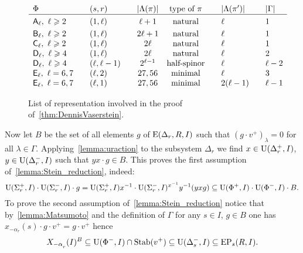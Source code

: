 \begin{figure}
\[\begin{array}{l @{\qquad} l @{\qquad} c @{\quad} c @{\qquad} l @{\qquad} l}
\Phi                                 & (s,r)         & |\Lambda(\pi)| & \text{type of $\pi$} & |\Lambda(\pi')|& |\Gamma|  \\ \hline\vphantom{\Bigl(}
\rA_\ell,\ \ell\geqslant 2           & (1,\ell)      & \ell+1         & \text{natural}       & \ell           & 1  \\     
\rB_\ell,\ \ell\geqslant 2           & (1,\ell)      & 2\ell+1        & \text{natural}       & \ell           & 1  \\     
\rC_\ell,\ \ell\geqslant 2           & (1,\ell)      & 2\ell          & \text{natural}       & \ell           & 1  \\
\rD_\ell,\ \ell\geqslant 4           & (1,\ell)      & 2\ell          & \text{natural}       & \ell           & 2  \\ 
\rD_\ell,\ \ell\geqslant 4           & (\ell,\ell-1) & 2^{\ell-1}     & \text{half-spinor}   & \ell           & \ell-2  \\
\rE_\ell,\ \ell=6,7                  & (\ell,2)      & 27, 56         & \text{minimal}       & \ell           & 3       \\ 
\rE_\ell,\ \ell=6,7                  & (\ell,1)      & 27, 56         & \text{minimal}       & 2(\ell-1)      & \ell-1  \end{array}\]
 \caption[Table]{List of representation involved in the proof of~\cref{thm:DennisVaserstein}.} \label{fig:table}
\end{figure}

Now let $B$ be the set of all elements $g$ of $\operatorname{E}(\Delta_r,R, I)$ such that $(g \cdot v^+)_\lambda = 0$ for all $\lambda\in\Gamma$.
Applying~\cref{lemma:uraction} to the subsystem $\Delta_r$ we find
$x\in\operatorname{U}(\Delta_r^+, I)$, $y\in \operatorname{U}(\Delta_r^-, I)$ such that $yx\cdot g \in B$.
This proves the first assumption of~\cref{lemma:Stein_reduction}, indeed:
\[ \operatorname{U}(\Sigma^+_r, I) \cdot \operatorname{U}(\Sigma^-_r, I) \cdot g = \operatorname{U}(\Sigma^+_r, I) x^{-1} \cdot \operatorname{U}(\Sigma^-_r, I)^{x^{-1}} y^{-1} (yxg) \subseteq \operatorname{U}(\Phi^+, I) \cdot \operatorname{U}(\Phi^-, I) \cdot B. \]
To prove the second assumption of~\cref{lemma:Stein_reduction} notice that by~\cref{lemma:Matsumoto} and the definition of $\Gamma$ for any $s\in I$, $ g\in B$ one has $x_{-\alpha_r}(s) \cdot g \cdot v^+ = g \cdot v^+$ hence
\[ X_{-\alpha\ssub{r}}(I)^{B} \subseteq \U(\Phi^-, I) \cap \Stab(v^+) \subseteq \U(\Delta_s^-, I) \subseteq \EP_s(R, I). \]

